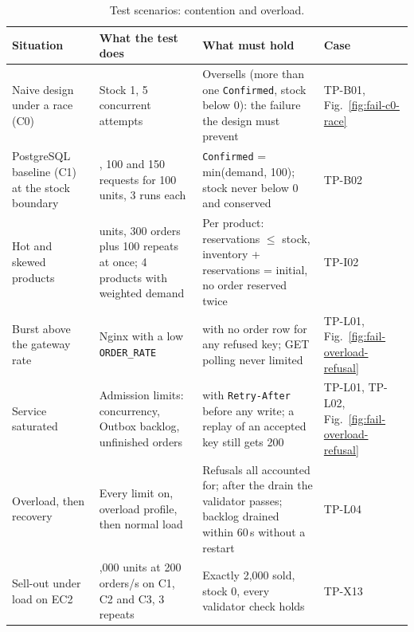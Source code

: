\documentclass[a4paper]{report}
\begin{document}
\begin{table}[!t]
\centering
\footnotesize
\renewcommand{\arraystretch}{1.15}
\begin{tabular}{@{}>{\raggedright\arraybackslash}p{}>{\raggedright\arraybackslash}p{}>{\raggedright\arraybackslash}p{}>{\raggedright\arraybackslash}p{}@{}}
\toprule
Situation & What the test does & What must hold & Case \\
\midrule
Naive design under a race (C0) & Stock 1, 5 concurrent attempts & Oversells (more than one \texttt{Confirmed}, stock below 0): the failure the design must prevent & TP-B01, Fig.~\ref{fig:fail-c0-race} \\
PostgreSQL baseline (C1) at the stock boundary & 50, 100 and 150 requests for 100 units, 3 runs each & \texttt{Confirmed} = min(demand, 100); stock never below 0 and conserved & TP-B02 \\
Hot and skewed products & 100 units, 300 orders plus 100 repeats at once; 4 products with weighted demand & Per product: reservations $\le$ stock, inventory + reservations = initial, no order reserved twice & TP-I02 \\
Burst above the gateway rate & Nginx with a low \texttt{ORDER\_RATE} & 429 with no order row for any refused key; GET polling never limited & TP-L01, Fig.~\ref{fig:fail-overload-refusal} \\
Service saturated & Admission limits: concurrency, Outbox backlog, unfinished orders & 503 with \texttt{Retry-After} before any write; a replay of an accepted key still gets 200 & TP-L01, TP-L02, Fig.~\ref{fig:fail-overload-refusal} \\
Overload, then recovery & Every limit on, overload profile, then normal load & Refusals all accounted for; after the drain the validator passes; backlog drained within 60\,s without a restart & TP-L04 \\
Sell-out under load on EC2 & 2,000 units at 200 orders/s on C1, C2 and C3, 3 repeats & Exactly 2,000 sold, stock 0, every validator check holds & TP-X13 \\
\bottomrule
\end{tabular}
\caption{Test scenarios: contention and overload.}
\label{tab:scen-load}
\end{table}
\end{document}
